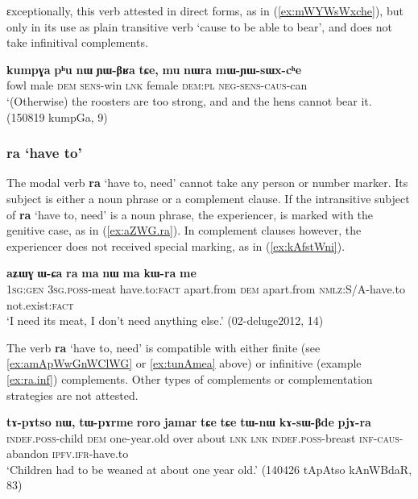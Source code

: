 \documentclass[oneside,a4paper,11pt]{article}
\newcommand{\ipa}[1]{\textbf{\phon#1}} %
\newcommand{\jpg}[2]{\ipa{#1} `#2'} %
\newcommand{\refb}[1]{(\ref{#1})}
\begin{document}
ɛxceptionally, this verb attested in direct forms, as in \refb{ex:mWYWsWxche}, but only in its use as plain transitive verb `cause to be able to bear', and does not take infinitival complements.

\begin{exe}
\ex \label{ex:mWYWsWxche}
\gll 
\ipa{kumpɣa} 	\ipa{pʰu} 	\ipa{nɯ} 	\ipa{ɲɯ-βʁa} 	\ipa{tɕe,} 	\ipa{mu} 	\ipa{nɯra} 	\ipa{mɯ-ɲɯ-sɯx-cʰe} \\
fowl male \textsc{dem} \textsc{sens}-win \textsc{lnk} female \textsc{dem:pl} \textsc{neg-sens-caus}-can \\
\glt `(Otherwise) the roosters are too strong, and and the hens cannot bear it. (150819 kumpGa, 9)
\end{exe} 

  \subsubsection{\jpg{ra}{have to}} \label{sec:ra}
  The modal verb \jpg{ra}{have to, need} cannot take any person or number marker. Its subject is either a noun phrase or a complement clause. If the intransitive subject of \jpg{ra}{have to, need} is a noun phrase, the experiencer, is marked with the genitive case, as in (\ref{ex:aZWG.ra}). In complement clauses however, the experiencer does not received special marking, as in \refb{ex:kAfstWni}.
    
  \begin{exe}
\ex \label{ex:aZWG.ra}
\gll \ipa{aʑɯɣ} 	\ipa{ɯ-ɕa} 	\ipa{ra} 	\ipa{ma} 	\ipa{nɯ} 	\ipa{ma} 	\ipa{kɯ-ra} 	\ipa{me} \\
\textsc{1sg:gen} \textsc{3sg.poss}-meat have.to:\textsc{fact} apart.from \textsc{dem} apart.from \textsc{nmlz:S/A}-have.to not.exist:\textsc{fact} \\
\glt `I need its meat, I don't need anything else.' (02-deluge2012, 14)
\end{exe}
 
 The verb \jpg{ra}{have to, need}  is compatible with either finite (see \ref{ex:amApWwGnWClWG} or \ref{ex:tunAmea} above) or infinitive (example \ref{ex:ra.inf}) complements. Other types of complements or complementation strategies are not attested.
 
 \begin{exe}
\ex \label{ex:ra.inf}
\gll   \ipa{tɤ-pɤtso} 	\ipa{nɯ,} 	\ipa{tɯ-pɤrme} 	\ipa{roro} 	\ipa{jamar} 	\ipa{tɕe} 	\ipa{tɕe} 	\ipa{tɯ-nɯ} 	\ipa{kɤ-sɯ-βde} 	\ipa{pjɤ-ra}  \\
\textsc{indef.poss}-child \textsc{dem} one-year.old over about \textsc{lnk} \textsc{lnk} \textsc{indef.poss}-breast \textsc{inf-caus}-abandon \textsc{ipfv.ifr}-have.to \\
\glt  `Children had to be weaned at about one year old.' (140426 tApAtso kAnWBdaR, 83)
\end{exe}  
\end{document}

